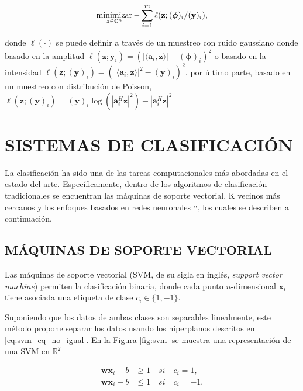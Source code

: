 \begin{itemize}
    \begin{equation}
        \operatorname*{minimizar}_{z \in \mathbb{C}^{n}} -\sum_{i=1}^{m} \ell(\mathbf{z};(\boldsymbol{\phi})_i/(\mathbf{y})_i),
    \end{equation}
    
    donde $\ell( \cdot )$ se puede definir a través de un muestreo con ruido gaussiano donde basado en la amplitud $\ell(\mathbf{z};\mathbf{y}_i) = (\vert \langle \mathbf{a}_i,\mathbf{z}\rangle \vert - (\boldsymbol{\phi})_i)^2$ o basado en la intensidad  $\ell(\mathbf{z};(\mathbf{y})_i) = (\vert \langle \mathbf{a}_i,\mathbf{z}\rangle \vert^2 - (\mathbf{y})_i)^2$. por último parte, basado en un muestreo con distribución de Poisson, $\ell(\mathbf{z};(\mathbf{y})_i) = {(\mathbf{y})_i \log(|\mathbf{a}_i^H \mathbf{z}|^2) -|\mathbf{a}_i^H \mathbf{z}|^2 }$ 
\end{itemize}





\chapter{SISTEMAS DE CLASIFICACIÓN}

La clasificación ha sido una de las tareas computacionales más abordadas en el estado del arte. Específicamente, dentro de los algoritmos de clasificación tradicionales se encuentran las máquinas de soporte vectorial, K vecinos más cercanos  y los enfoques basados en redes neuronales $^,$$^,$, los cuales se describen a continuación.
\section{MÁQUINAS DE SOPORTE VECTORIAL}
Las máquinas de soporte vectorial (SVM, de su sigla en inglés, \textit{support vector machine})  permiten la clasificación binaria, donde cada punto $n$-dimensional $\mathbf{x}_i$ tiene asociada una etiqueta de clase $c_i \in \{1,-1\}$.

Suponiendo que los datos de ambas clases son separables linealmente, este método propone separar los datos usando los hiperplanos descritos en  \eqref{eq:svm_eq_no_igual}. En la Figura \ref{fig:svm} se muestra una representación de una SVM en $\mathbb{R}^2$

\begin{equation}
    \begin{split}
        \mathbf{w}\mathbf{x}_i + b &\geq 1 \quad si \quad c_i=1, \\
        \mathbf{w}\mathbf{x}_i + b &\leq 1 \quad si \quad c_i=-1.
    \end{split}\label{eq:svm_eq_no_igual}
\end{equation}


